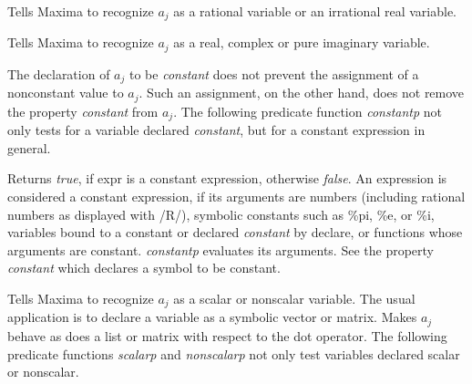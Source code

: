 \documentclass[../Maxima_Workbook.tex]{subfiles}
\begin{document}
 \hfill \tcr{[property]}

\lz Tells Maxima to recognize $ a_j $ as a rational variable or an irrational real variable.

\lzz {} \hfill \tcr{[property]}

 \hfill \tcr{[property]}

 \hfill \tcr{[property]}

\lz Tells Maxima to recognize $ a_j $ as a real, complex or pure imaginary variable.

\lzz {} \hfill \tcr{[property]}

\lz The declaration of $ a_j $ to be \emph{constant} does not prevent the assignment of a nonconstant value to $ a_j $. Such an assignment, on the other hand, does not remove the property \emph{constant} from $ a_j $. The following predicate function \emph{constantp} not only tests for a variable declared \emph{constant}, but for a constant expression in general.

\lzz {} \hfill {}

\lz Returns \emph{true}, if expr is a constant expression, otherwise \emph{false}. An expression is considered a constant expression, if its arguments are numbers (including rational numbers as displayed with /R/), symbolic constants such as \%pi, \%e, or \%i, variables bound to a constant or declared \emph{constant} by declare, or functions whose arguments are constant. \emph{constantp} evaluates its arguments. See the property \emph{constant} which declares a symbol to be constant.

\lzz {} \hfill \tcr{[property]}

 \hfill \tcr{[property]}

\lz Tells Maxima to recognize $ a_j $ as a scalar or nonscalar variable. The usual application is to declare a variable as a symbolic vector or matrix. Makes $ a_j $ behave as does a list or matrix with respect to the dot operator. The following predicate functions \emph{scalarp} and \emph{nonscalarp} not only test variables declared scalar or nonscalar.

\lzz {} \hfill {}
\end{document}
